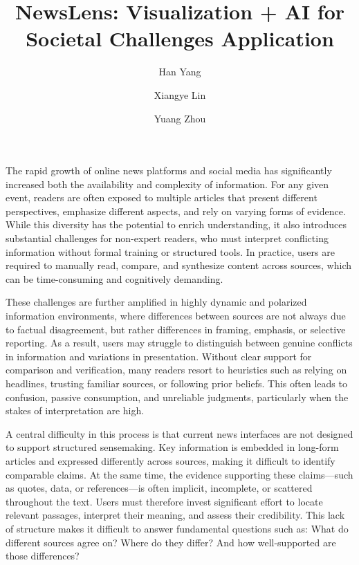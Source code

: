 \documentclass{vgtc}                          %
\title{NewsLens: Visualization + AI for Societal Challenges Application}
\author{Han Yang %
\and Xiangye Lin %
\and Yuang Zhou}
\affiliation{\scriptsize UMass Amherst\\
\scriptsize \{hanyang, xiangyelin, yuazhou\}@umass.edu}
\begin{document}


\maketitle

The rapid growth of online news platforms and social media has significantly increased both the availability and complexity of information. For any given event, readers are often exposed to multiple articles that present different perspectives, emphasize different aspects, and rely on varying forms of evidence. While this diversity has the potential to enrich understanding, it also introduces substantial challenges for non-expert readers, who must interpret conflicting information without formal training or structured tools. In practice, users are required to manually read, compare, and synthesize content across sources, which can be time-consuming and cognitively demanding.

These challenges are further amplified in highly dynamic and polarized information environments, where differences between sources are not always due to factual disagreement, but rather differences in framing, emphasis, or selective reporting. As a result, users may struggle to distinguish between genuine conflicts in information and variations in presentation. Without clear support for comparison and verification, many readers resort to heuristics such as relying on headlines, trusting familiar sources, or following prior beliefs. This often leads to confusion, passive consumption, and unreliable judgments, particularly when the stakes of interpretation are high.

A central difficulty in this process is that current news interfaces are not designed to support structured sensemaking. Key information is embedded in long-form articles and expressed differently across sources, making it difficult to identify comparable claims. At the same time, the evidence supporting these claims—such as quotes, data, or references—is often implicit, incomplete, or scattered throughout the text. Users must therefore invest significant effort to locate relevant passages, interpret their meaning, and assess their credibility. This lack of structure makes it difficult to answer fundamental questions such as: What do different sources agree on? Where do they differ? And how well-supported are those differences?
\end{document}
